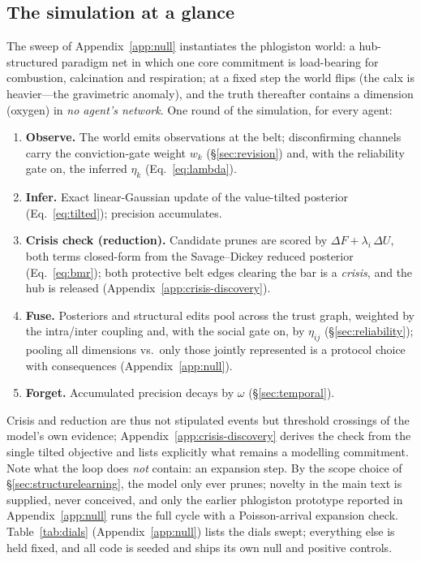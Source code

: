 \documentclass[runningheads]{llncs}
\begin{document}
\subsection{The simulation at a glance}
\label{sec:model}

The sweep of Appendix~\ref{app:null} instantiates the phlogiston world: a hub-structured
paradigm net in which one core commitment is load-bearing for combustion, calcination and
respiration; at a fixed step the world flips (the calx is heavier---the gravimetric anomaly),
and the truth thereafter contains a dimension (oxygen) in \emph{no agent's network}. One round
of the simulation, for every agent:

\begin{enumerate}\itemsep1pt
\item \textbf{Observe.} The world emits observations at the belt; disconfirming channels carry
the conviction-gate weight $w_k$ (\S\ref{sec:revision}) and, with the reliability gate on, the
inferred $\eta_k$ (Eq.~\ref{eq:lambda}).
\item \textbf{Infer.} Exact linear-Gaussian update of the value-tilted posterior
(Eq.~\ref{eq:tilted}); precision accumulates.
\item \textbf{Crisis check (reduction).} Candidate prunes are scored by
$\Delta F+\lambda_i\,\Delta U$, both terms closed-form from the Savage--Dickey reduced
posterior (Eq.~\ref{eq:bmr}); both protective belt edges clearing the bar is a \emph{crisis},
and the hub is released (Appendix~\ref{app:crisis-discovery}).
\item \textbf{Fuse.} Posteriors and structural edits pool across the trust graph, weighted by
the intra/inter coupling and, with the social gate on, by $\eta_{ij}$
(\S\ref{sec:reliability}); pooling all dimensions vs.\ only those jointly represented is a
protocol choice with consequences (Appendix~\ref{app:null}).
\item \textbf{Forget.} Accumulated precision decays by $\omega$ (\S\ref{sec:temporal}).
\end{enumerate}

Crisis and reduction are thus not stipulated events but threshold crossings of the model's own
evidence; Appendix~\ref{app:crisis-discovery} derives the check from the single tilted
objective and lists explicitly what remains a modelling commitment. Note what the loop does
\emph{not} contain: an expansion step. By the scope choice of \S\ref{sec:structurelearning},
the model only ever prunes; novelty in the main text is supplied, never conceived, and only
the earlier phlogiston prototype reported in Appendix~\ref{app:null} runs the full cycle
with a Poisson-arrival expansion check.
Table~\ref{tab:dials} (Appendix~\ref{app:null}) lists the dials swept; everything else is held
fixed, and all code is seeded and ships its own null and positive controls.
\end{document}
